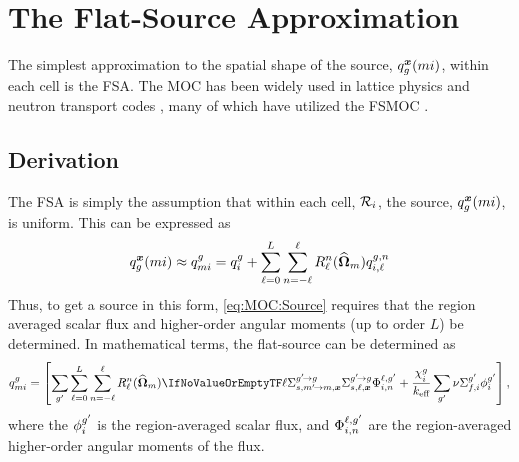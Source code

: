 {    \section{The Flat-Source Approximation}{\label{sec:MOC:FSA}
        The simplest approximation to the spatial shape of the source, $\source[mi][g][\loc]$, within each cell is the \acf{FSA}.
        The \ac{MOC} has been widely used in lattice physics and neutron transport codes \cite{Knott2010}, many of which have utilized the \ac{FSMOC} \cite{Halsall1980,Hong1998,Saji2000,Smith2002,Sugimura2006,Masiello2008,Boyd2014,Collins2016}.

        \subsection{Derivation}{\label{ssec:MOC:FSA:Derivation}
            The \ac{FSA} is simply the assumption that within each cell, $\Region$, the source, $\source[mi][g][\loc]$, is uniform.
            This can be expressed as
            \begin{equation}\label{eq:MOC:FSA:Source Shape}
                \source[mi][g][\loc] \approx \srcF[mi] = \srcF + \suml[\ell=0][L]\suml[n=-\ell][\ell]\SH[\ell][n][\dirm]\srcF[i,\ell][g,n]
            \end{equation}
            Thus, to get a source in this form, \cref{eq:MOC:Source} requires that the region averaged scalar flux and higher-order angular moments (up to order $L$) be determined.
            In mathematical terms, the flat-source can be determined as
            \begin{equation}\label{eq:MOC:FSA:Source Computation}
                \srcF[mi] =
                    \left[
                        \suml[\gprime]\suml[\ell=0][L]\suml[n=-\ell][\ell]\SH[\ell][n][\dirm]\xss[\ell]\afluxmom[\gprime]
                        + \frac{\spect}{\keff}\suml[\gprime]\nufis\sflux[\gprime]
                    \right],
            \end{equation}
            where the $\sflux[\gprime]$ is the region-averaged scalar flux, and $\afluxmom[\gprime]$ are the region-averaged higher-order angular moments of the flux.

}}}
